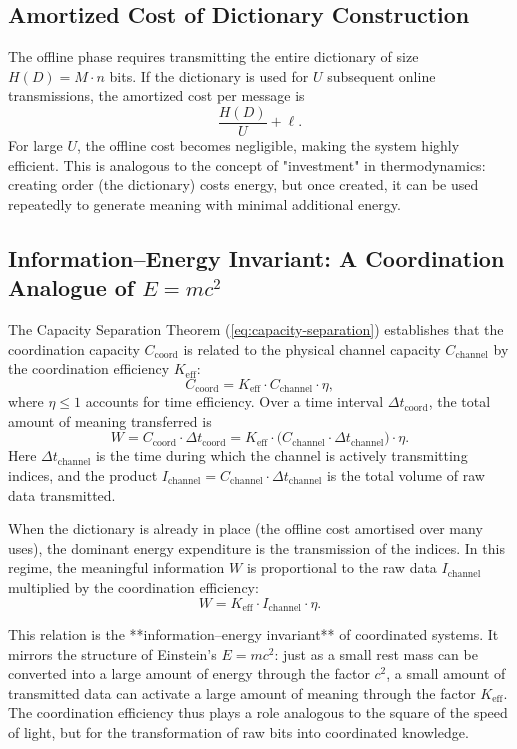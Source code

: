 \documentclass[12pt,a4paper]{article}
\theoremstyle{remark}
\begin{document}
	\subsection{Amortized Cost of Dictionary Construction}
	
	The offline phase requires transmitting the entire dictionary of size $H(D) = M \cdot n$ bits. If the dictionary is used for $U$ subsequent online transmissions, the amortized cost per message is
	\[
	\frac{H(D)}{U} + \ell.
	\]
	For large $U$, the offline cost becomes negligible, making the system highly efficient. This is analogous to the concept of "investment" in thermodynamics: creating order (the dictionary) costs energy, but once created, it can be used repeatedly to generate meaning with minimal additional energy.
	
	\subsection{Information--Energy Invariant: A Coordination Analogue of \texorpdfstring{\(E=mc^2\)}{E=mc\^2}}
	\label{subsec:info_energy_invariant}
	
	The Capacity Separation Theorem (\ref{eq:capacity-separation}) establishes that the coordination capacity \(C_{\text{coord}}\) is related to the physical channel capacity \(C_{\text{channel}}\) by the coordination efficiency \(K_{\mathrm{eff}}\):
	\[
	C_{\text{coord}} = K_{\mathrm{eff}} \cdot C_{\text{channel}} \cdot \eta,
	\]
	where \(\eta \le 1\) accounts for time efficiency. Over a time interval \(\Delta t_{\text{coord}}\), the total amount of meaning transferred is
	\[
	W = C_{\text{coord}} \cdot \Delta t_{\text{coord}} = K_{\mathrm{eff}} \cdot \bigl( C_{\text{channel}} \cdot \Delta t_{\text{channel}} \bigr) \cdot \eta.
	\]
	Here \(\Delta t_{\text{channel}}\) is the time during which the channel is actively transmitting indices, and the product \(I_{\text{channel}} = C_{\text{channel}} \cdot \Delta t_{\text{channel}}\) is the total volume of raw data transmitted.
	
	When the dictionary is already in place (the offline cost amortised over many uses), the dominant energy expenditure is the transmission of the indices. In this regime, the meaningful information \(W\) is proportional to the raw data \(I_{\text{channel}}\) multiplied by the coordination efficiency:
	\[
	\boxed{W = K_{\mathrm{eff}} \cdot I_{\text{channel}} \cdot \eta}.
	\]
	
	This relation is the **information--energy invariant** of coordinated systems. It mirrors the structure of Einstein's \(E = m c^2\): just as a small rest mass can be converted into a large amount of energy through the factor \(c^2\), a small amount of transmitted data can activate a large amount of meaning through the factor \(K_{\mathrm{eff}}\). The coordination efficiency thus plays a role analogous to the square of the speed of light, but for the transformation of raw bits into coordinated knowledge.
	
\end{document}
